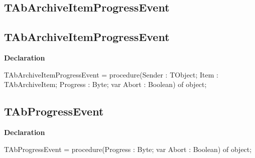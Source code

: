 \documentclass{report}
\newif\ifpdf
\begin{document}
\subsection*{\large{\textbf{TAbArchiveItemProgressEvent}}\normalsize\hspace{1ex}\hrulefill}
\else
\subsection*{TAbArchiveItemProgressEvent}
\fi
\label{AbArcTyp-TAbArchiveItemProgressEvent}
\begin{list}{}{
\setlength{\itemindent}{0cm}
\setlength{\listparindent}{0cm}
\setlength{\leftmargin}{\evensidemargin}
\addtolength{\leftmargin}{\tmplength}
\settowidth{\labelsep}{X}
\addtolength{\leftmargin}{\labelsep}
\setlength{\labelwidth}{\tmplength}
}
\item[\textbf{Declaration}\hfill]
\ifpdf
\begin{flushleft}
\fi
\begin{ttfamily}
TAbArchiveItemProgressEvent = procedure(Sender : TObject; Item : TAbArchiveItem; Progress : Byte; var Abort : Boolean) of object;\end{ttfamily}

\ifpdf
\end{flushleft}
\fi

\end{list}
\ifpdf
\subsection*{\large{\textbf{TAbProgressEvent}}\normalsize\hspace{1ex}\hrulefill}
\else
\subsection*{TAbProgressEvent}
\fi
\label{AbArcTyp-TAbProgressEvent}
\begin{list}{}{
\setlength{\itemindent}{0cm}
\setlength{\listparindent}{0cm}
\setlength{\leftmargin}{\evensidemargin}
\addtolength{\leftmargin}{\tmplength}
\settowidth{\labelsep}{X}
\addtolength{\leftmargin}{\labelsep}
\setlength{\labelwidth}{\tmplength}
}
\item[\textbf{Declaration}\hfill]
\ifpdf
\begin{flushleft}
\fi
\begin{ttfamily}
TAbProgressEvent = procedure(Progress : Byte; var Abort : Boolean) of object;\end{ttfamily}

\ifpdf
\end{flushleft}
\fi

\end{list}
\ifpdf
\end{document}
